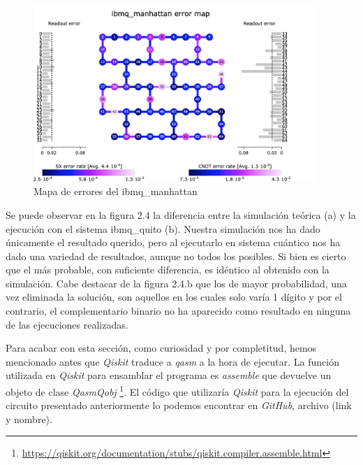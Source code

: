   \begin{figure}[H]
    \centering
    \includegraphics[width=0.95\textwidth]{TFG/imagenes/system_error_manhattan.png}
    \caption{Mapa de errores del ibmq\_manhattan} 
 \end{figure}

Se puede observar en la figura 2.4 la diferencia entre la simulación teórica (a) y la ejecución con el sistema ibmq\_quito (b). Nuestra simulación nos ha dado únicamente el resultado querido, pero al ejecutarlo en sistema cuántico nos ha dado una variedad de resultados, aunque no todos los posibles. Si bien es cierto que el más probable, con suficiente diferencia, es idéntico al obtenido con la simulación. Cabe destacar de la figura 2.4.b que los de mayor probabilidad, una vez eliminada la solución, son aquellos en los cuales solo varía 1 dígito y por el contrario, el complementario binario no ha aparecido como resultado en ninguna de las ejecuciones realizadas. \newline

Para acabar con esta sección, como curiosidad y por completitud, hemos mencionado antes que \textit{Qiskit} traduce a \textit{qasm} a la hora de ejecutar. La función utilizada en \textit{Qiskit} para ensamblar el programa es \textit{assemble} que devuelve un objeto de clase \textit{QasmQobj} \footnote{\url{https://qiskit.org/documentation/stubs/qiskit.compiler.assemble.html}}. El código que utilizaría \textit{Qiskit} para la ejecución del circuito presentado anteriormente lo podemos encontrar en \textit{GitHub}, archivo (link y nombre).\newline

